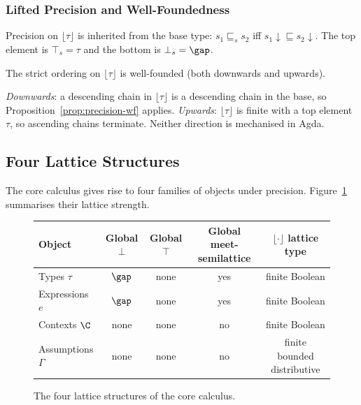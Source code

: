 \subsubsection{\no Lifted Precision and Well-Foundedness}
\label{sec:lifted-well-foundedness}

Precision on $\lfloor\tau\rfloor$ is inherited from the base type: $s_1 \sqsubseteq_s s_2$ iff $s_1{\downarrow} \sqsubseteq s_2{\downarrow}$. The top element is $\top_s = \tau$ and the bottom is $\bot_s = \gap$.

\begin{corollary}\label{cor:lifted-wf}
The strict ordering on $\lfloor\tau\rfloor$ is well-founded (both downwards and upwards).
\end{corollary}

\textit{Downwards}: a descending chain in $\lfloor\tau\rfloor$ is a descending chain in the base, so Proposition~\ref{prop:precision-wf} applies. \textit{Upwards}: $\lfloor\tau\rfloor$ is finite with a top element $\tau$, so ascending chains terminate. Neither direction is mechanised in Agda.

\subsection{Four Lattice Structures}
\label{sec:four-lattices}

The core calculus gives rise to four families of objects under precision. Figure~\ref{fig:four-lattices} summarises their lattice strength.

\begin{figure}[t]
\centering
\begin{tabular}{lcccc}
\toprule
\textbf{Object} & \textbf{Global $\bot$} & \textbf{Global $\top$} & \textbf{Global meet-semilattice} & \textbf{$\lfloor\cdot\rfloor$ lattice type} \\
\midrule
Types $\tau$ & $\gap$ & none & yes & finite Boolean \\
Expressions $e$ & $\gap$ & none & yes & finite Boolean \\
Contexts $\C$ & none & none & no & finite Boolean \\
Assumptions $\Gamma$ & none & none & no & finite bounded distributive \\
\bottomrule
\end{tabular}
\caption{The four lattice structures of the core calculus.}
\label{fig:four-lattices}
\end{figure}


